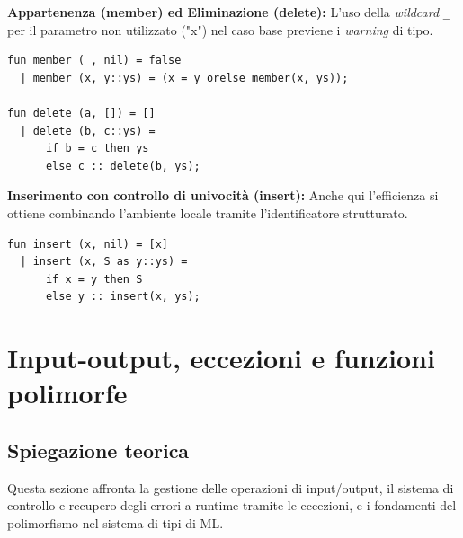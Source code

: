 \documentclass[12pt, a4paper]{article}
\begin{document}
\textbf{Appartenenza (member) ed Eliminazione (delete):}
L'uso della \textit{wildcard} \texttt{\_} per il parametro non utilizzato ("x") nel caso base previene i \textit{warning} di tipo.
\begin{verbatim}
fun member (_, nil) = false
  | member (x, y::ys) = (x = y orelse member(x, ys));

fun delete (a, []) = []
  | delete (b, c::ys) = 
      if b = c then ys 
      else c :: delete(b, ys);
\end{verbatim}

\textbf{Inserimento con controllo di univocità (insert):}
Anche qui l'efficienza si ottiene combinando l'ambiente locale tramite l'identificatore strutturato.
\begin{verbatim}
fun insert (x, nil) = [x]
  | insert (x, S as y::ys) = 
      if x = y then S 
      else y :: insert(x, ys);
\end{verbatim}


\section{Input-output, eccezioni e funzioni polimorfe}

\subsection{Spiegazione teorica}
Questa sezione affronta la gestione delle operazioni di input/output, il sistema di controllo e recupero degli errori a runtime tramite le eccezioni, e i fondamenti del polimorfismo nel sistema di tipi di ML.
\end{document}
